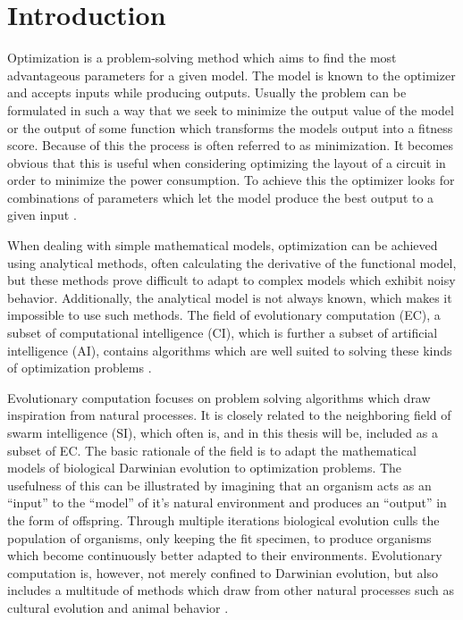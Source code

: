 \section{Introduction}

Optimization is a problem-solving method which aims to find the most advantageous parameters for a given model. The model is known to the optimizer and accepts inputs while producing outputs. Usually the problem can be formulated in such a way that we seek to minimize the output value of the model or the output of some function which transforms the models output into a fitness score. Because of this the process is often referred to as minimization. It becomes obvious that this is useful when considering optimizing the layout of a circuit in order to minimize the power consumption. To achieve this the optimizer looks for combinations of parameters which let the model produce the best output to a given input \cite{Eiben2015_origins}.


When dealing with simple mathematical models, optimization can be achieved using analytical methods, often calculating the derivative of the functional model, but these methods prove difficult to adapt to complex models which exhibit noisy behavior. Additionally, the analytical model is not always known, which makes it impossible to use such methods. The field of evolutionary computation (EC), a subset of computational intelligence (CI), which is further a subset of artificial intelligence (AI), contains algorithms which are well suited to solving these kinds of optimization problems \cite{Michalewicz1997,zhang2015comprehensive}.

Evolutionary computation focuses on problem solving algorithms which draw inspiration from natural processes. It is closely related to the neighboring field of swarm intelligence (SI), which often is, and in this thesis will be, included as a subset of EC. The basic rationale of the field is to adapt the mathematical models of biological Darwinian evolution to optimization problems. The usefulness of this can be illustrated by imagining that an organism acts as an ``input'' to the ``model'' of it's natural environment and produces an ``output'' in the form of offspring. Through multiple iterations biological evolution culls the population of organisms, only keeping the fit specimen, to produce organisms which become continuously better adapted to their environments. Evolutionary computation is, however, not merely confined to Darwinian evolution, but also includes a multitude of methods which draw from other natural processes such as cultural evolution and animal behavior \cite{engelbrecht2007computational}.

